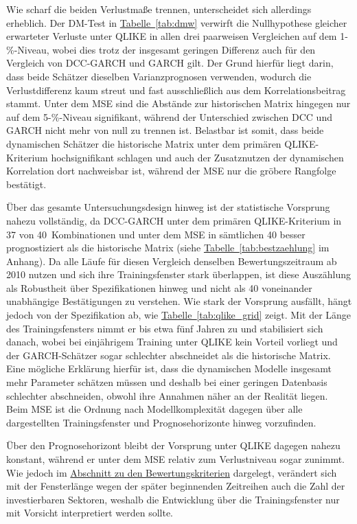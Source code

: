 \documentclass[12pt,a4paper]{article}
\begin{document}


Wie scharf die beiden Verlustmaße trennen, unterscheidet sich allerdings erheblich.
Der DM-Test in \hyperref[tab:dmw]{Tabelle~\ref*{tab:dmw}} verwirft die Nullhypothese gleicher erwarteter Verluste unter QLIKE in allen drei paarweisen Vergleichen auf dem 1-\%-Niveau, wobei dies trotz der insgesamt geringen Differenz auch für den Vergleich von DCC-GARCH und GARCH gilt.
Der Grund hierfür liegt darin, dass beide Schätzer dieselben Varianzprognosen verwenden, wodurch die Verlustdifferenz kaum streut und fast ausschließlich aus dem Korrelationsbeitrag stammt.
Unter dem MSE sind die Abstände zur historischen Matrix hingegen nur auf dem 5-\%-Niveau signifikant, während der Unterschied zwischen DCC und GARCH nicht mehr von null zu trennen ist.
Belastbar ist somit, dass beide dynamischen Schätzer die historische Matrix unter dem primären QLIKE-Kriterium hochsignifikant schlagen und auch der Zusatznutzen der dynamischen Korrelation dort nachweisbar ist, während der MSE nur die gröbere Rangfolge bestätigt.



Über das gesamte Untersuchungsdesign hinweg ist der statistische Vorsprung nahezu vollständig, da DCC-GARCH unter dem primären QLIKE-Kriterium in 37 von 40~Kombinationen und unter dem MSE in sämtlichen 40 besser prognostiziert als die historische Matrix (siehe \hyperref[tab:bestzaehlung]{Tabelle~\ref*{tab:bestzaehlung}} im Anhang).
Da alle Läufe für diesen Vergleich denselben Bewertungszeitraum ab 2010 nutzen und sich ihre Trainingsfenster stark überlappen, ist diese Auszählung als Robustheit über Spezifikationen hinweg und nicht als 40 voneinander unabhängige Bestätigungen zu verstehen.
Wie stark der Vorsprung ausfällt, hängt jedoch von der Spezifikation ab, wie \hyperref[tab:qlike_grid]{Tabelle~\ref*{tab:qlike_grid}} zeigt.
Mit der Länge des Trainingsfensters nimmt er bis etwa fünf Jahren zu und stabilisiert sich danach, wobei bei einjährigem Training unter QLIKE kein Vorteil vorliegt und der GARCH-Schätzer sogar schlechter abschneidet als die historische Matrix.
Eine mögliche Erklärung hierfür ist, dass die dynamischen Modelle insgesamt mehr Parameter schätzen müssen und deshalb bei einer geringen Datenbasis schlechter abschneiden, obwohl ihre Annahmen näher an der Realität liegen.
Beim MSE ist die Ordnung nach Modellkomplexität dagegen über alle dargestellten Trainingsfenster und Prognosehorizonte hinweg vorzufinden.

Über den Prognosehorizont bleibt der Vorsprung unter QLIKE dagegen nahezu konstant, während er unter dem MSE relativ zum Verlustniveau sogar zunimmt.
Wie jedoch im \hyperref[subsec:kriterien]{Abschnitt zu den Bewertungskriterien} dargelegt, verändert sich mit der Fensterlänge wegen der später beginnenden Zeitreihen auch die Zahl der investierbaren Sektoren, weshalb die Entwicklung über die Trainingsfenster nur mit Vorsicht interpretiert werden sollte.
\end{document}
